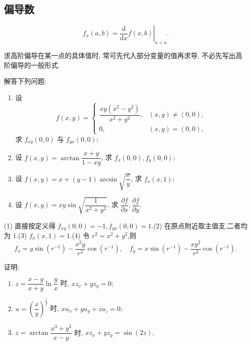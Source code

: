 \subsection{偏导数}

\begin{proposition}[\markstar]
    \[
        f_x(a,b)=\left.\dfrac{\mathrm{d}}{\mathrm{d}x}f(x,b)\right|_{x=a}.
    \]
\end{proposition}

\begin{remark}
    求高阶偏导在某一点的具体值时, 常可先代入部分变量的值再求导, 不必先写出高阶偏导的一般形式.
\end{remark}

\begin{example}
    解答下列问题:
    \begin{enumerate}
        \item 设
              \[
                  f(x,y)=
                  \begin{cases}
                      \dfrac{xy(x^2-y^2)}{x^2+y^2}, & (x,y)\ne(0,0), \\
                      0,                            & (x,y)=(0,0),
                  \end{cases}
              \]
              求 $f_{xy}(0,0)$ 与 $f_{yx}(0,0)$;
        \item 设 $\displaystyle f(x,y)=\arctan\dfrac{x+y}{1-xy}$, 求 $f_x(0,0),f_y(0,0)$;
        \item 设 $\displaystyle f(x,y)=x+(y-1)\arcsin\sqrt{\dfrac{x}{y}}$, 求 $f_x(x,1)$;
        \item 设 $\displaystyle f(x,y)=xy\sin\sqrt{\dfrac{1}{x^2+y^2}}$, 求 $\dfrac{\partial f}{\partial x},\dfrac{\partial f}{\partial y}$.
    \end{enumerate}
\end{example}
\exampleblank

\begin{solution}

    (1) 直接按定义得 $f_{xy}(0,0)=-1,f_{yx}(0,0)=1$.(2) 在原点附近取主值支,二者均为 $1$.(3) $f_x(x,1)=1$.(4) 令 $r^2=x^2+y^2$,则
    \[
        f_x=y\sin(r^{-1})-\dfrac{x^2y}{r^3}\cos(r^{-1}),\quad
        f_y=x\sin(r^{-1})-\dfrac{xy^2}{r^3}\cos(r^{-1}).
    \]
\end{solution}

\begin{example}
    证明:
    \begin{enumerate}
        \item $\displaystyle z=\dfrac{x-y}{x+y}\ln\dfrac{y}{x}$ 时, $xz_x+yz_y=0$;
        \item $\displaystyle u=\left(\dfrac{x}{y}\right)^{\frac{z}{y}}$ 时, $xu_x+yu_y+zu_z=0$;
        \item $\displaystyle z=\arctan\dfrac{x^3+y^3}{x-y}$ 时, $xz_x+yz_y=\sin(2z)$.
    \end{enumerate}
\end{example}
\exampleblank

